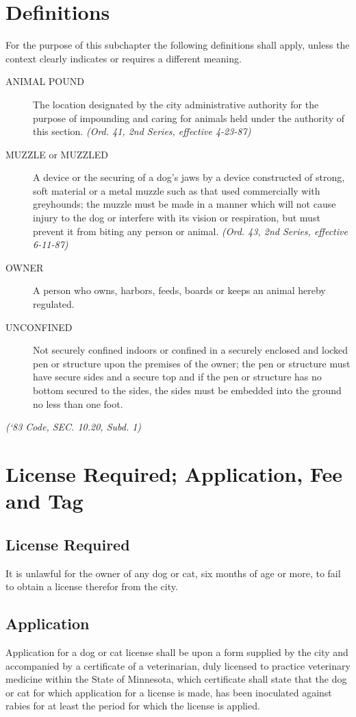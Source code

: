 \documentclass[code.tex]{subfiles}
\begin{document}
\setcounter{section}{14}
\section{Definitions}
For the purpose of this subchapter the following definitions shall apply, unless the context clearly indicates or requires a different meaning.
\begin{description}
\item[ANIMAL POUND] The location designated by the city administrative authority for the purpose of impounding and caring for animals held under the authority of this section. \emph{(Ord. 41, 2nd Series, effective 4-23-87)}
\item[MUZZLE or MUZZLED] A device or the securing of a dog’s jaws by a device constructed of strong, soft material or a metal muzzle such as that used commercially with greyhounds; the muzzle must be made in a manner which will not cause injury to the dog or interfere with its vision or respiration, but must prevent it from biting any person or animal. \emph{(Ord. 43, 2nd Series, effective 6-11-87)}
\item[OWNER] A person who owns, harbors, feeds, boards or keeps an animal hereby regulated.
\item[UNCONFINED] Not securely confined indoors or confined in a securely enclosed and locked pen or structure upon the premises of the owner; the pen or structure must have secure sides and a secure top and if the pen or structure has no bottom secured to the sides, the sides must be embedded into the ground no less than one foot.
\end{description}
\emph{(‘83 Code, SEC. 10.20, Subd. 1)}
\section{License Required; Application, Fee and Tag}
\subsection{License Required}
It is unlawful for the owner of any dog or cat, six months of age or more, to fail to obtain a license therefor from the city.
\subsection{Application}
Application for a dog or cat license shall be upon a form supplied by the city and accompanied by a certificate of a veterinarian, duly licensed to practice veterinary medicine within the State of Minnesota, which certificate shall state that the dog or cat for which application for a license is made, has been inoculated against rabies for at least the period for which the license is applied.
\end{document}
